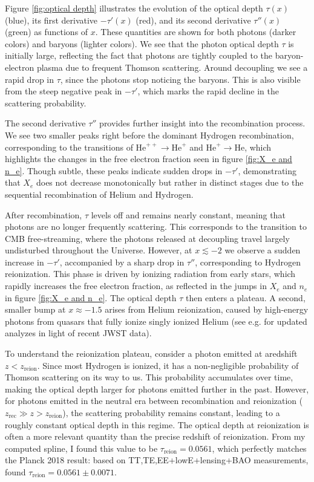 \documentclass{aa}
\numberwithin{equation}{section}
\numberwithin{table}{section}
\numberwithin{figure}{section}
\begin{document}
Figure \ref{fig:optical depth} illustrates the evolution of the optical depth $\tau(x)$ (blue), its first derivative $-\tau'(x)$ (red), and its second derivative $\tau''(x)$ (green) as functions of $x$. These quantities are shown for both photons (darker colors) and baryons (lighter colors). We see that the photon optical depth $\tau$ is initially large, reflecting the fact that photons are tightly coupled to the baryon-electron plasma due to frequent Thomson scattering. Around decoupling we see a rapid drop in $\tau$, since the photons stop noticing the baryons. This is also visible from the steep negative peak in $-\tau'$, which marks the rapid decline in the scattering probability. 

The second derivative $\tau''$ provides further insight into the recombination process. We see two smaller peaks right before the dominant Hydrogen recombination, corresponding to the transitions of $\text{He}^{++} \rightarrow \text{He}^{+}$ and $\text{He}^{+} \rightarrow \text{He}$, which highlights the changes in the free electron fraction seen in figure \ref{fig:X_e and n_e}. Though subtle, these peaks indicate sudden drops in $-\tau'$, demonstrating that $X_e$ does not decrease monotonically but rather in distinct stages due to the sequential recombination of Helium and Hydrogen.

After recombination, $\tau$ levels off and remains nearly constant, meaning that photons are no longer frequently scattering. This corresponds to the transition to CMB free-streaming, where the photons released at decoupling travel largely undisturbed throughout the Universe. However, at $x \lesssim -2$ we observe a sudden increase in $-\tau'$, accompanied by a sharp drop in $\tau''$, corresponding to Hydrogen reionization. This phase is driven by ionizing radiation from early stars, which rapidly increases the free electron fraction, as reflected in the jumps in $X_e$ and $n_e$ in figure \ref{fig:X_e and n_e}. The optical depth $\tau$ then enters a plateau. A second, smaller bump at $x \approx -1.5$ arises from Helium reionization, caused by high-energy photons from quasars that fully ionize singly ionized Helium (see e.g. \cite{Helium} for updated analyzes in light of recent JWST data).

To understand the reionization plateau, consider a photon emitted at aredshift $z<z_\text{reion}$. Since most Hydrogen is ionized, it has a non-negligible probability of Thomson scattering on its way to us. This probability accumulates over time, making the optical depth larger for photons emitted further in the past. However, for photons emitted in the neutral era between recombination and reionization ($z_\text{rec} \gg z > z_\text{reion}$), the scattering probability remains constant, leading to a roughly constant optical depth in this regime. The optical depth at reionization is often a more relevant quantity than the precise redshift of reionization. From my computed spline, I found this value to be $\tau_\text{reion} = 0.0561$, which perfectly matches the Planck 2018 result: based on TT,TE,EE+lowE+lensing+BAO measurements, \cite{Planck} found $\tau_\text{reion} = 0.0561 \pm 0.0071$.
\end{document}

